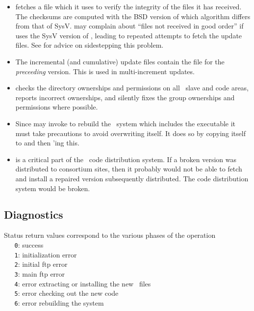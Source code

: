 \begin{itemize}
\item
    fetches a  file which it uses to verify the
   integrity of the files it has received.  The checksums are computed with
   the BSD version of  which algorithm differs from that of SysV.
    may complain about ``files not received in good order'' if 
    uses the SysV version of , leading to repeated
   attempts to fetch the update files.  See 
   for advice on sidestepping this problem.

\item
   The incremental (and cumulative) update files contain the 
   file for the {\em preceeding} version.  This is used in multi-increment
   updates.

\item
    checks the directory ownerships and permissions on all
   \aipspp\ slave and code areas, reports incorrect ownerships, and
   silently fixes the group ownerships and permissions where possible.

\item
   Since  may invoke  to rebuild the \aipspp\ 
   system which includes the  executable it must take precautions
   to avoid overwriting itself.  It does so by copying itself to \exe{inhale-}
   and then \unixexe{exec}'ing this.

\item
    is a critical part of the \aipspp\ code distribution system.
   If a broken version was distributed to consortium sites, then it probably
   would not be able to fetch and install a repaired version subsequently
   distributed.  The code distribution system would be broken.
\end{itemize}

\subsection*{Diagnostics}

Status return values correspond to the various phases of the operation
\\ \verb+   0+: success
\\ \verb+   1+: initialization error
\\ \verb+   2+: initial ftp error
\\ \verb+   3+: main ftp error
\\ \verb+   4+: error extracting or installing the new \rcs\ files
\\ \verb+   5+: error checking out the new code
\\ \verb+   6+: error rebuilding the system

